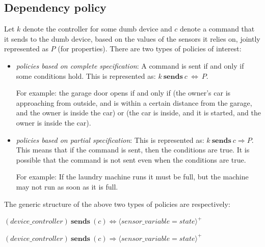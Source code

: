 \documentclass{article}
\begin{document}
\subsection{Dependency policy}
\label{subsec:dep}
Let $k$ denote the controller for some dumb device and $c$ denote a command that it sends to the dumb device, based on the values of the sensors it relies on, jointly represented as $P$ (for properties). 
There are two types of policies of interest:
\begin{itemize}[topsep=0pt,itemsep=0ex,partopsep=1ex,parsep=1ex]
\item \textit {policies based on complete specification}: A command is sent if and only if some conditions hold. This is represented as: $k ~\textbf{sends}~ c~\Leftrightarrow~P$.  

For example:
the garage door opens if and only if (the owner's car is approaching from outside, and is within a certain distance from the garage, and the owner is inside the car) or (the car is inside, and it is started, and the owner is inside the car).

\item \textit {policies based on partial specification}:  This is represented as: $k ~\textbf{sends}~ c \Rightarrow P$. This means that if the command is sent, then the conditions are true. It is possible that the command is not sent even when the conditions are true. 

For example: If the laundry machine runs it must be full, but the machine may not run as soon as it is full.
\end{itemize}
The generic structure of the above two types of policies are respectively:

\hspace{2cm}$(device\_controller) ~\textbf{sends}~(c) \Leftrightarrow \langle \mathit{sensor\_variable = state}\rangle^{+}$ 

\hspace{2cm}$(device\_controller) ~\textbf{sends}~(c) \Rightarrow \langle \mathit{sensor\_variable = state}\rangle^{+}$ \\
\end{document}
